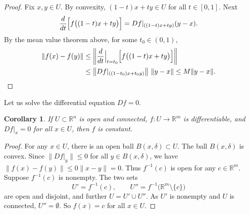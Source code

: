 \documentclass[12pt,openany]{book}
\newcommand{\snorm}[1]{\lVert {#1} \rVert}
\newcommand{\norm}[1]{\left\lVert {#1} \right\rVert}
\newcommand{\R}{{\mathbb{R}}}
\theoremstyle{plain}
\newtheorem{cor}[thm]{Corollary}
\theoremstyle{remark}
\theoremstyle{definition}
\theoremstyle{exercise}
\theoremstyle{example}
\begin{document}
\begin{proof}
Fix $x,y \in U$.  By convexity,
$(1-t)x+ty \in U$ for all $t \in [0,1]$.
Next
\begin{equation*}
\frac{d}{dt} \Bigl[f\bigl((1-t)x+ty\bigr)\Bigr]
=
Df|_{((1-t)x+ty)} (y-x) .
\end{equation*}
By the mean value theorem above, for
some $t_0 \in (0,1)$,
\begin{equation*}
\begin{split}
\snorm{f(x)-f(y)} & \leq
\norm{\frac{d}{dt} \Big|_{t=t_0} \Bigl[ f\bigl((1-t)x+ty\bigr) \Bigr] }
\\
& \leq
\norm{Df|_{((1-t_0)x+t_0y)}} \, \snorm{y-x} \leq
M \snorm{y-x} . \qedhere
\end{split}
\end{equation*}
\end{proof}

Let us solve the differential equation $Df = 0$.

\begin{cor} \label{thm:svzerodersol}
If $U \subset \R^n$ is open and connected, $f \colon U \to \R^m$ is differentiable,
and $Df|_x = 0$ for all $x \in U$, then $f$ is constant.
\end{cor}

\begin{proof}
For any $x \in U$, there is an open ball $B(x,\delta) \subset U$.  The ball
$B(x,\delta)$ is convex.  Since
$\snorm{Df|_y} \leq 0$ for all $y \in B(x,\delta)$, we have
$\snorm{f(x)-f(y)} \leq 0 \snorm{x-y} = 0$.
Thus $f^{-1}(c)$ is open for any $c \in \R^m$.  Suppose
$f^{-1}(c)$ is nonempty.  
The two sets
\begin{equation*}
U' = f^{-1}(c), \qquad U'' = f^{-1}\bigl(\R^m\setminus\{c\}\bigr)
\end{equation*}
are open and disjoint, and further $U = U' \cup U''$.  As $U'$ is nonempty
and $U$ is connected, $U'' = \emptyset$.  So $f(x) = c$ for all $x \in U$.
\end{proof}
\end{document}
